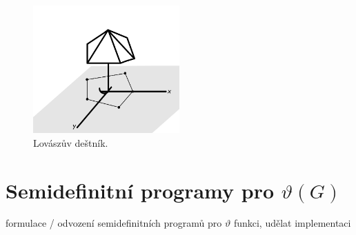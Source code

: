 \begin{figure}[h!]
    \centering
    \includegraphics[width=0.5\textwidth]{img/umbrella.png} 
    \caption{Lovászův deštník.}
    \label{fig:umbrella}
\end{figure}


\section{Semidefinitní programy pro $\vartheta(G)$}

formulace / odvození semidefinitních programů pro $\vartheta$ funkci, udělat implementaci
